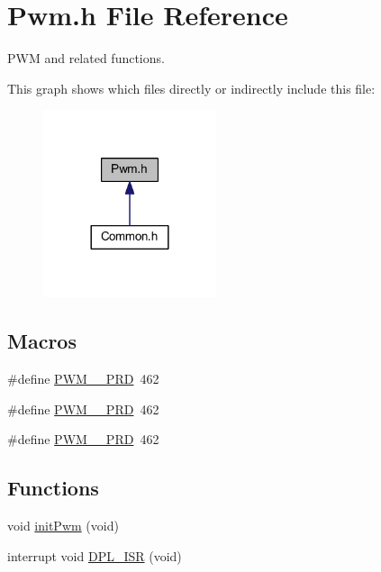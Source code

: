 \hypertarget{a00038}{\section{Pwm.\-h File Reference}
\label{a00038}
}


P\-W\-M and related functions.  


This graph shows which files directly or indirectly include this file\-:\nopagebreak
\begin{figure}[H]
\begin{center}
\leavevmode
\includegraphics[width=144pt]{a00071}
\end{center}
\end{figure}
\subsection*{Macros}
\begin{DoxyCompactItemize}
\item 
\#define \hyperlink{a00038_a4d7cfbafe2831b32ac69043fe2a51d1f}{P\-W\-M\-\_\-\_\-\-P\-R\-D}~462
\item 
\#define \hyperlink{a00038_a446b4ce74c284aad70100e3f7fecffa0}{P\-W\-M\-\_\-\_\-\-P\-R\-D}~462
\item 
\#define \hyperlink{a00038_a11feddb81d3d7f2f6e001b77685a1f60}{P\-W\-M\-\_\-\_\-\-P\-R\-D}~462
\end{DoxyCompactItemize}
\subsection*{Functions}
\begin{DoxyCompactItemize}
\item 
void \hyperlink{a00038_a13138c31d3576e8a8858b964882cfc69}{init\-Pwm} (void)
\item 
interrupt void \hyperlink{a00038_a5532a53363218854b0e4b15049d773f7}{D\-P\-L\-\_\-\-I\-S\-R} (void)
\end{DoxyCompactItemize}
